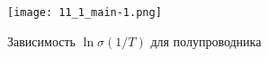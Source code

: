 \documentclass[a4paper]{article}
\begin{document}
\begin{figure}[h]
    \begin{center}
        \texttt{[image: 11\_1\_main-1.png]}
        \caption{Зависимость $\ln{\sigma} (1/T)$ для полупроводника}
        \label{gr4}
    \end{center}
\end{figure}





\end{document}
